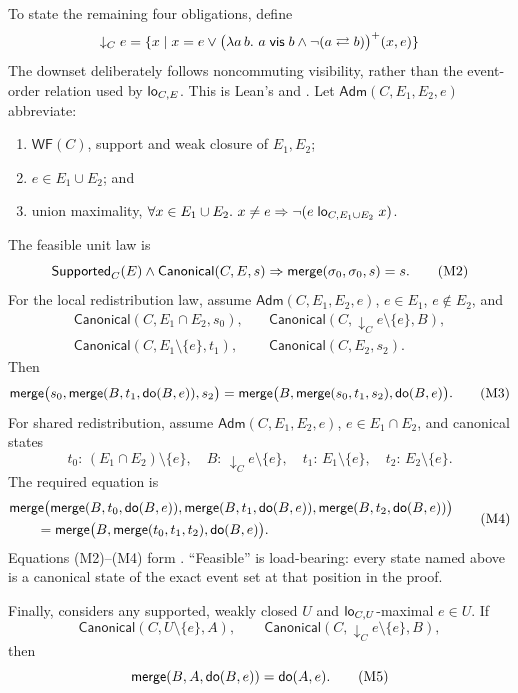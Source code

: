 To state the remaining four obligations, define
\[
 \downarrow_C e=\{x\mid x=e\lor
   \bigl(\lambda a\,b.\ a\vis b\land
       \neg(a\rightleftarrows b)\bigr)^+(x,e)\}
\]
The downset deliberately follows noncommuting visibility, rather than
the event-order relation used by $\lo_{C,E}$. This is Lean's
 and .
Let $\mathsf{Adm}(C,E_1,E_2,e)$ abbreviate:
\begin{enumerate}
\item $\mathsf{WF}(C)$, support and weak closure of $E_1,E_2$;
\item $e\in E_1\cup E_2$; and
\item union maximality,
$\forall x\in E_1\cup E_2.\ x\ne e\Rightarrow
\neg(e\mathrel{\lo_{C,E_1\cup E_2}}x)$.
\end{enumerate}
The feasible unit law is
\[
 \mathsf{Supported}_C(E)\land\mathsf{Canonical}(C,E,s)
 \Rightarrow \merge(\init,\init,s)=s.
 \tag*{(M2)}
\]
For the local redistribution law, assume
$\mathsf{Adm}(C,E_1,E_2,e)$, $e\in E_1$, $e\notin E_2$, and
\begin{align*}
 \mathsf{Canonical}(C,E_1\cap E_2,s_0),\quad
 &\mathsf{Canonical}(C,\downarrow_Ce\setminus\{e\},B),\\
 \mathsf{Canonical}(C,E_1\setminus\{e\},t_1),\quad
 &\mathsf{Canonical}(C,E_2,s_2).
\end{align*}
Then
\[
 \merge\bigl(s_0,\merge(B,t_1,\mathsf{do}(B,e)),s_2\bigr)
 =\merge\bigl(B,\merge(s_0,t_1,s_2),\mathsf{do}(B,e)\bigr).
 \tag*{(M3)}
\]
For shared redistribution, assume
$\mathsf{Adm}(C,E_1,E_2,e)$, $e\in E_1\cap E_2$, and canonical states
\[
 t_0:\,(E_1\cap E_2)\setminus\{e\},\quad
 B:\,\downarrow_Ce\setminus\{e\},\quad
 t_1:\,E_1\setminus\{e\},\quad t_2:\,E_2\setminus\{e\}.
\]
The required equation is
\[
 \begin{aligned}
 &\merge\bigl(\merge(B,t_0,\mathsf{do}(B,e)),
                \merge(B,t_1,\mathsf{do}(B,e)),
                \merge(B,t_2,\mathsf{do}(B,e))\bigr)\\
 &\qquad=\merge\bigl(B,\merge(t_0,t_1,t_2),\mathsf{do}(B,e)\bigr).
 \end{aligned}
 \tag*{(M4)}
\]
Equations (M2)--(M4) form . ``Feasible'' is
load-bearing: every state named above is a canonical state of the exact event
set at that position in the proof.

Finally,  considers any supported, weakly closed $U$ and
$\lo_{C,U}$-maximal $e\in U$. If
\[
 \mathsf{Canonical}(C,U\setminus\{e\},A),\qquad
 \mathsf{Canonical}(C,\downarrow_Ce\setminus\{e\},B),
\]
then
\[
  \merge(B,A,\mathsf{do}(B,e))=\mathsf{do}(A,e).
  \tag*{(M5)}
\]

